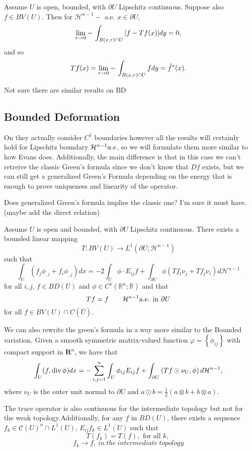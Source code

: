 \begin{theorem}
Assume $U$ is open, bounded, with $\partial U$ Lipschitz continuous. Suppose also $f \in B V(U)$. Then for $\mathcal{H}^{n-1}-$ a.e. $x \in \partial U$,
$$
\lim _{r \rightarrow 0} \dashint_{B(x, r) \cap U}|f-T f(x)| d y=0,
$$
and so
$$
T f(x)=\lim _{r \rightarrow 0} \dashint_{B(x, r) \cap U} f d y= \tilde{f}^*(x).
$$
\end{theorem}
\begin{question}
Not sure there are similar results on BD
\end{question}
\subsection{Bounded Deformation}
On \cite{RogerPaper} they actually consider $C^1$ boundaries however all the results will certainly hold for Lipschitz boundary ${\mathcal H}^{n-1} a.e$, so we will formulate them more similar to how Evans does. 
Additionally, the main difference is that in this case we can't retreive  the classic Green's formula since we don't know that $Df$ exists, but we can still get a generalized Green's Formula depending on the energy that is enough to prove  uniqueness and  linearity of the operator.
\begin{question}
Does  generalized Green's formula implies the classic one? I'm sure it must have.(maybe add the direct relation)
\end{question}

\begin{theorem}
 Assume $U$ is open and bounded, with $\partial U$ Lipschitz continuous. There exists a bounded linear mapping
$$
T: B V(U) \rightarrow L^1\left(\partial U ; \mathcal{H}^{n-1}\right)
$$
such that
$$
\int_U \left(f_j \phi_{,i}+f_i\phi_{,j}\right) d x=-2\int_U \phi \cdot E_{ij}f +\int_{\partial U}\phi(T f_i\nu_j+Tf_j \nu_i) d \mathcal{H}^{n-1}
$$
for all $i,j$, $f \in B D(U)$ and $\phi \in C^1\left(\mathbb{R}^n ; \mathbb{R}\right)$ and that
$$Tf = f\qquad {\mathcal H}^{n-1} \text{a.e. in } \partial U$$
for all $f\in BV(U)\cap C(\bar{U})$.
\end{theorem}
We can also rewrite the green's formula in a way more similar to the Bounded variation. Given a smooth symmetric matrix-valued function $\varphi=\left\{\phi_{i j}\right\}$ with compact support in $\mathbf{R}^n$, we have that
$$\int_{U}(f, \operatorname{div} \phi) d x=-\sum_{i, j=1}^n \int_{U} \phi_{ij} E_{ij}f+\int_{\partial U}\left(Tf \odot \nu_{U}, \phi\right) d {\mathcal H}^{n-1},$$ where $\nu_{U}$ is the outer unit normal to $\partial U$ and $a \odot b=\frac{1}{2}(a \otimes b+b \otimes a)$.
\begin{remark}
The trace operator is also continuous for the intermediate topology  but not for the weak topology.Additionally, for any $f$ in $B D(U)$, there exists a sequence $f_k \in \mathscr{C}(U)^n \cap L^1(U)$, $E_{ij}f_k\in L^1(U)$ such that
$$
T\left(f_k\right)=T(f), \text { for all } k \text {, }
$$
$$f_k \rightarrow f,\ in \ the \ intermediate\ topology$$
\end{remark}

